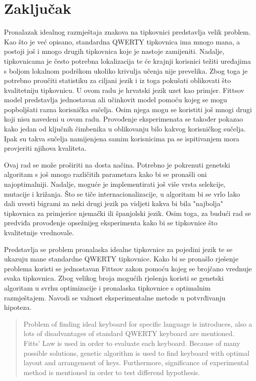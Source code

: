 \documentclass[times, utf8, zavrsni]{fer}
\begin{document}
\chapter{Zaključak}
Pronalazak idealnog razmještaja znakova na tipkovnici predstavlja velik problem. Kao što je već opisano, standardna QWERTY tipkovnica ima mnogo mana, a postoji još i mnogo drugih tipkovnica koje je nastoje zamijeniti. Nadalje, tipkovnicama je često potrebna lokalizacija te će krajnji korisnici težiti uređajima s boljom lokalnom podrškom ukoliko krivulja učenja  nije prevelika. Zbog toga je potrebno proučiti statistiku za ciljani jezik i iz toga pokušati oblikovati što kvalitetniju tipkovnicu. U ovom radu je hrvatski jezik uzet kao primjer. Fittsov model predstavlja jednostavan ali učinkovit model pomoću kojeg se mogu popboljšati razna korisnička sučelja. Osim njega mogu se koristiti još mnogi drugi koji nisu navedeni u ovom radu. Provođenje eksperimenata se također pokazao kako jedan od ključnih čimbenika u oblikovanju bilo kakvog korisničkog sučelja. Ipak su takva sučelja namijenjena samim korisnicima pa se ispitivanjem mora provjeriti njihova kvaliteta.

Ovaj rad se može proširiti na dosta načina. Potrebno je pokrenuti genetski algoritam s još mnogo različitih parametara kako bi se pronašli oni najoptimalniji. Nadalje, moguće je implementirati još više vrsta selekcije, mutacije i križanja. Što se tiče internacionalizacije, u algoritam bi se vrlo lako dali uvesti bigrami za neki drugi jezik pa vidjeti kakva bi bila "najbolja" tipkovnica za primjerice njemački ili španjolski jezik. Osim toga, za budući rad se predviđa provođenje opsežnijeg eksperimenta kako bi se tipkovnice što kvalitetnije vrednovale.




\begin{sazetak}
Predstavlja se problem pronalaska idealne tipkovnice za pojedini jezik te se ukazuju mane standardne QWERTY tipkovnice. Kako bi se pronašlo rješenje problema koristi se jednostavan Fittsov zakon pomoću kojeg se brojčano vrednuje svaka tipkovnica. Zbog velikog broja mogućih rješenja koristi se genetski algoritam u svrhu optimizacije i pronalaska tipkovnice s optimalnim razmještajem. Navodi se važnost eksperimentalne metode u potvrđivanju hipoteza.

\end{sazetak}

\begin{abstract}
Problem of finding ideal keyboard for specific language is introduces, also a lots of disadvantages of standard QWERTY keyboard are mentioned. Fitts' Law is used in order to evaluate each keyboard. Because of many possible solutions, genetic algorithm is used to find keyboard with optimal layout and arrangement of keys. Furthermore, significance of experimental method is mentioned in order to test differend hypothesis.

\end{abstract}
\end{document}
